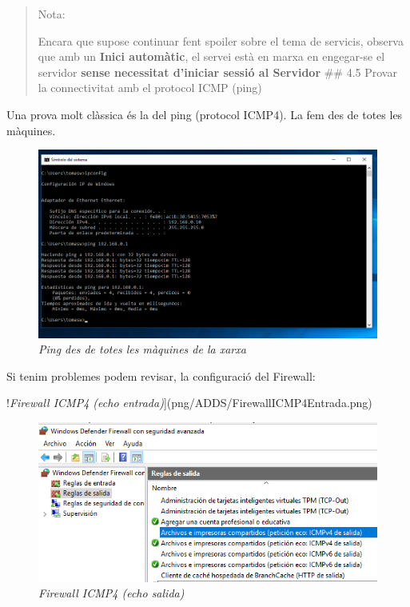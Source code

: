 \documentclass[
  a4paper,
]{article}
\begin{document}
\begin{quote}
Nota:

Encara que supose continuar fent spoiler sobre el tema de servicis,
observa que amb un \textbf{Inici automàtic}, el servei està en marxa en
engegar-se el servidor \textbf{sense necessitat d'iniciar sessió al
Servidor} \#\# 4.5 Provar la connectivitat amb el protocol ICMP (ping)
\end{quote}

Una prova molt clàssica és la del ping (protocol ICMP4). La fem des de
totes les màquines.

\begin{figure}
\centering
\includegraphics{png/ADDS/ping.png}
\caption{\emph{Ping des de totes les màquines de la xarxa}}
\end{figure}

Si tenim problemes podem revisar, la configuració del Firewall:

!\emph{Firewall ICMP4 (echo
entrada)}{]}(png/ADDS/FirewallICMP4Entrada.png)

\begin{figure}
\centering
\includegraphics{png/ADDS/FirewallICMP4Salida.png}
\caption{\emph{Firewall ICMP4 (echo salida)}}
\end{figure}
\end{document}
